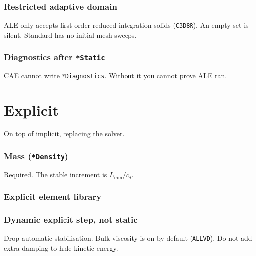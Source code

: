 \documentclass[11pt,a4paper]{article}
\begin{document}
\subsubsection*{Restricted adaptive domain}

ALE only accepts first-order reduced-integration solids (\texttt{C3D8R}).
An empty set is silent. Standard has no initial mesh sweeps.



\subsubsection*{Diagnostics after \texttt{*Static}}

CAE cannot write \texttt{*Diagnostics}. Without it you cannot prove ALE ran.



\section{Explicit}

On top of implicit, replacing the solver. 

\subsubsection*{Mass (\texttt{*Density})}

Required. The stable increment is $L_{\min}/c_d$.



\subsubsection*{Explicit element library}



\subsubsection*{Dynamic explicit step, not static}

Drop automatic stabilisation. Bulk viscosity is on by default (\texttt{ALLVD}).
Do not add extra damping to hide kinetic energy.
\end{document}
